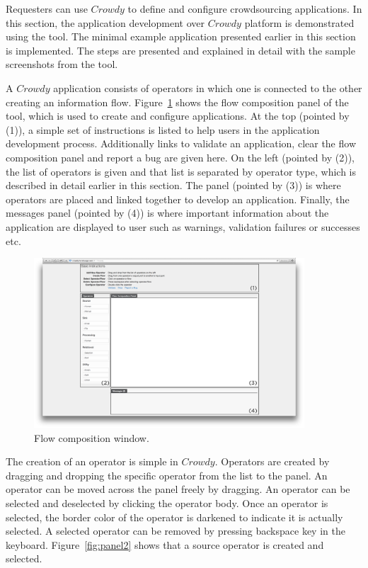 Requesters can use $Crowdy$ to define and configure crowdsourcing applications. 
In this section, the application development over $Crowdy$ platform is 
demonstrated using the tool. The minimal example application presented earlier 
in this section is implemented. The steps are presented and explained in detail 
with the sample screenshots from the tool.

A $Crowdy$ application consists of operators in which one is connected to the other creating 
an information flow. Figure~\ref{fig:panel1} shows the flow composition panel of the tool, which 
is used to create and configure applications. At the top (pointed by (1)), a simple set of 
instructions is listed to help users in the application development process. Additionally links 
to validate an application, clear the flow composition panel and report a bug are given here. 
On the left (pointed by (2)), the list of operators is given and that list is separated by operator 
type, which is described in detail earlier in this section. The panel (pointed by (3)) is where 
operators are placed and linked together to develop an application. Finally, the messages 
panel (pointed by (4)) is where important information about the application are displayed to 
user such as warnings, validation failures or successes etc.

\begin{figure}[ht]
	\centering
	\includegraphics[width=0.9\textwidth]{figures/tool/panel1.png}
	\caption{Flow composition window.}
	\label{fig:panel1}
\end{figure}

The creation of an operator is simple in $Crowdy$. Operators are created by dragging and 
dropping the specific operator from the list to the panel. An operator can be moved across 
the panel freely by dragging. An operator can be selected and deselected by clicking the 
operator body. Once an operator is selected, the border color of the operator is darkened 
to indicate it is actually selected. A selected operator can be removed by 
pressing backspace key in the keyboard. Figure~\ref{fig:panel2} shows that a source 
operator is created and selected.

